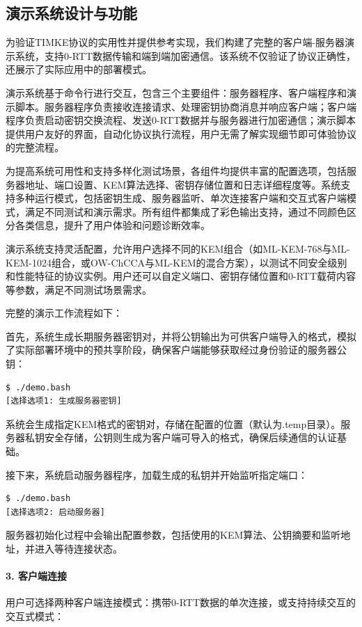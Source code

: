 \subsection{演示系统设计与功能}

为验证TIMKE协议的实用性并提供参考实现，我们构建了完整的客户端-服务器演示系统，支持0-RTT数据传输和端到端加密通信。该系统不仅验证了协议正确性，还展示了实际应用中的部署模式。

演示系统基于命令行进行交互，包含三个主要组件：服务器程序、客户端程序和演示脚本。服务器程序负责接收连接请求、处理密钥协商消息并响应客户端；客户端程序负责启动密钥交换流程、发送0-RTT数据并与服务器进行加密通信；演示脚本提供用户友好的界面，自动化协议执行流程，用户无需了解实现细节即可体验协议的完整流程。

为提高系统可用性和支持多样化测试场景，各组件均提供丰富的配置选项，包括服务器地址、端口设置、KEM算法选择、密钥存储位置和日志详细程度等。系统支持多种运行模式，包括密钥生成、服务器监听、单次连接客户端和交互式客户端模式，满足不同测试和演示需求。所有组件都集成了彩色输出支持，通过不同颜色区分各类信息，提升了用户体验和问题诊断效率。

演示系统支持灵活配置，允许用户选择不同的KEM组合（如ML-KEM-768与ML-KEM-1024组合，或OW-ChCCA与ML-KEM的混合方案），以测试不同安全级别和性能特征的协议实例。用户还可以自定义端口、密钥存储位置和0-RTT载荷内容等参数，满足不同测试场景需求。

完整的演示工作流程如下：

首先，系统生成长期服务器密钥对，并将公钥输出为可供客户端导入的格式，模拟了实际部署环境中的预共享阶段，确保客户端能够获取经过身份验证的服务器公钥：

\begin{verbatim}
$ ./demo.bash
[选择选项1: 生成服务器密钥]
\end{verbatim}

系统会生成指定KEM格式的密钥对，存储在配置的位置（默认为.temp目录）。服务器私钥安全存储，公钥则生成为客户端可导入的格式，确保后续通信的认证基础。

接下来，系统启动服务器程序，加载生成的私钥并开始监听指定端口：

\begin{verbatim}
$ ./demo.bash
[选择选项2: 启动服务器]
\end{verbatim}

服务器初始化过程中会输出配置参数，包括使用的KEM算法、公钥摘要和监听地址，并进入等待连接状态。

\paragraph{3. 客户端连接} 
用户可选择两种客户端连接模式：携带0-RTT数据的单次连接，或支持持续交互的交互式模式：

